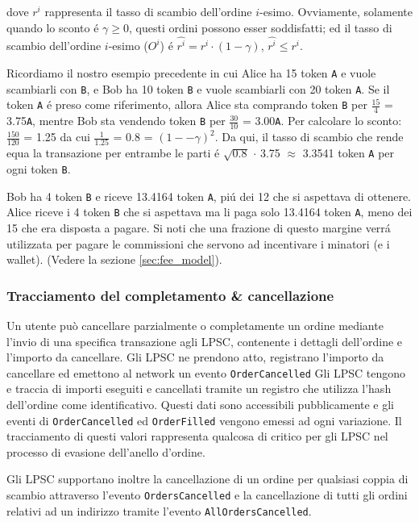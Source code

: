 \documentclass[UTF8,nofonts]{article}
\begin{document}
\begin{multicols}{2}
dove $r^i$ rappresenta il tasso di scambio dell'ordine $i$-esimo. Ovviamente, solamente quando lo sconto \'e $\gamma \ge 0$, questi ordini possono esser soddisfatti; ed il tasso di scambio dell'ordine $i$-esimo  ($O^i$) \'e $\hat{r^i} = r^i \cdot (1-\gamma)$, $\hat{r^i}\le r^i$.

Ricordiamo il nostro esempio precedente in cui Alice ha 15 token \verb|A| e vuole scambiarli con \verb|B|, e Bob ha 10 token \verb|B| e vuole scambiarli con 20 token \verb|A|. Se il token \verb|A| \'e preso come riferimento, allora Alice sta comprando token \verb|B| per $\frac{15}{4}$ = 3.75\verb|A|, mentre Bob sta vendendo token \verb|B| per $\frac{30}{10}$ = 3.00\verb|A|. Per calcolare lo sconto: $\frac{150}{120}$ = 1.25 da cui $\frac{1}{1.25}$ = 0.8 = $(1 −- \gamma)^2$. Da qui, il tasso di scambio che rende equa la transazione per entrambe le parti \'e $\sqrt{0.8}$ $\cdot$ 3.75 $\approx$ 3.3541 token \verb|A| per ogni token \verb|B|.

Bob ha 4 token \verb|B| e riceve 13.4164 token \verb|A|,  pi\'u dei 12 che si aspettava di ottenere. Alice riceve i 4 token \verb|B| che si aspettava ma li paga solo 13.4164 token \verb|A|, meno dei 15 che era disposta a pagare. Si noti che una frazione di questo margine verr\'a utilizzata per pagare le commissioni che servono ad incentivare i minatori (e i wallet). (Vedere la sezione  \ref{sec:fee_model}).


\subsubsection{Tracciamento del completamento \& cancellazione}

Un utente può cancellare parzialmente o completamente un ordine mediante l'invio di una specifica transazione agli LPSC, contenente i dettagli dell'ordine e l'importo da cancellare. Gli LPSC ne prendono atto, registrano l'importo da cancellare ed emettono al network un evento \verb|OrderCancelled| Gli LPSC tengono e traccia di importi eseguiti e cancellati tramite un registro che utilizza l'hash dell'ordine come identificativo. Questi dati sono accessibili pubblicamente e gli eventi di \verb|OrderCancelled| ed \verb|OrderFilled| vengono emessi ad ogni variazione. Il tracciamento di questi valori rappresenta qualcosa di critico per gli LPSC nel processo di evasione dell'anello d'ordine.

Gli LPSC supportano inoltre la cancellazione di un ordine per qualsiasi coppia di scambio attraverso l'evento \verb|OrdersCancelled| e la cancellazione di tutti gli ordini relativi ad un indirizzo tramite l'evento \verb|AllOrdersCancelled|.



\end{multicols}
\end{document}
